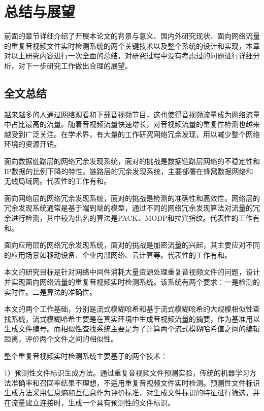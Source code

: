 \chapter{总结与展望}\label{chap:introduction}

前面的章节详细介绍了开展本论文的背景与意义、国内外研究现状、面向网络流量的重复音视频文件实时检测系统的两个关键技术以及整个系统的设计和实现，本章对以上研究内容进行一次全面的总结，对研究过程中没有考虑过的问题进行详细分析，对下一步研究工作做出合理的展望。

\section{全文总结}
越来越多的人通过网络观看和下载音视频节目，这也使得音视频流量成为网络流量中占比最高的流量。随着音视频流量快速增长，对音视频流量的重复性检测也越来越受到广泛关注。在学术界，有大量的工作研究网络冗余发现，用以减少整个网络环境的资源开销。

面向数据链路层的网络冗余发现系统，面对的挑战是数据链路层网络的不稳定性和IP数据的比例下降的特性。链路层的冗余发现系统，主要部署在蜂窝数据网络和无线局域网。代表性的工作有\cite{Lumezanu2010The}和\cite{Halepovic2012}。

面向网络层的网络冗余发现系统，面对的挑战是检测的准确性和高效性。网络层的冗余发现系统通常是基于端到端的模型，通过不同的网络冗余发现算法对流量的冗余进行检测，其中较为出名的算法是PACK、MODP和拉宾指纹。代表性的工作有\cite{Spring2000}和\cite{Yu}。

面向应用层的网络冗余发现系统，面对的挑战是加密流量的兴起，其主要应对不同的应用场景如移动设备、企业内部网络、云计算等。代表性的工作有\cite{Aggarwal}和\cite{Feng2013How}。

本文的研究目标是针对网络中间件消耗大量资源处理重复音视频文件的问题，设计并实现面向网络流量的重复音视频实时检测系统。该系统有两个要求：一是检测的实时性。二是算法的准确性。

本文的两个工作基础，分别是流式模糊哈希和基于流式模糊哈希的大规模相似性查找系统，流式模糊哈希主要是在真实环境中生成音视频流量的摘要，作为基准用以生成文件编号。而相似性查找系统主要是为了计算两个流式模糊哈希值之间的编辑距离，评价两个文件之间的相似性。

整个重复音视频实时检测系统主要基于的两个技术：

1）预测性文件标识生成方法。通过重复音视频文件预测实验，传统的机器学习方法准确率和召回率结果不理想，不适用重复音视频文件实时检测。预测性文件标识生成方法采用信息熵和互信息作为评价标准，对生成文件标识的特征进行筛选，并在流量建立连接时，生成一个具有预测性的文件标识。 

